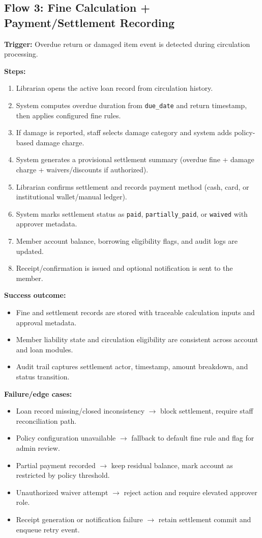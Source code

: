 \documentclass[12pt,a4paper]{article}
\begin{document}
\subsection*{Flow 3: Fine Calculation + Payment/Settlement Recording}
\textbf{Trigger:} Overdue return or damaged item event is detected during circulation processing.

\textbf{Steps:}
\begin{enumerate}
    \item Librarian opens the active loan record from circulation history.
    \item System computes overdue duration from \texttt{due\_date} and return timestamp, then applies configured fine rules.
    \item If damage is reported, staff selects damage category and system adds policy-based damage charge.
    \item System generates a provisional settlement summary (overdue fine + damage charge + waivers/discounts if authorized).
    \item Librarian confirms settlement and records payment method (cash, card, or institutional wallet/manual ledger).
    \item System marks settlement status as \texttt{paid}, \texttt{partially\_paid}, or \texttt{waived} with approver metadata.
    \item Member account balance, borrowing eligibility flags, and audit logs are updated.
    \item Receipt/confirmation is issued and optional notification is sent to the member.
\end{enumerate}

\textbf{Success outcome:}
\begin{itemize}
    \item Fine and settlement records are stored with traceable calculation inputs and approval metadata.
    \item Member liability state and circulation eligibility are consistent across account and loan modules.
    \item Audit trail captures settlement actor, timestamp, amount breakdown, and status transition.
\end{itemize}

\textbf{Failure/edge cases:}
\begin{itemize}
    \item Loan record missing/closed inconsistency $\rightarrow$ block settlement, require staff reconciliation path.
    \item Policy configuration unavailable $\rightarrow$ fallback to default fine rule and flag for admin review.
    \item Partial payment recorded $\rightarrow$ keep residual balance, mark account as restricted by policy threshold.
    \item Unauthorized waiver attempt $\rightarrow$ reject action and require elevated approver role.
    \item Receipt generation or notification failure $\rightarrow$ retain settlement commit and enqueue retry event.
\end{itemize}
\end{document}
